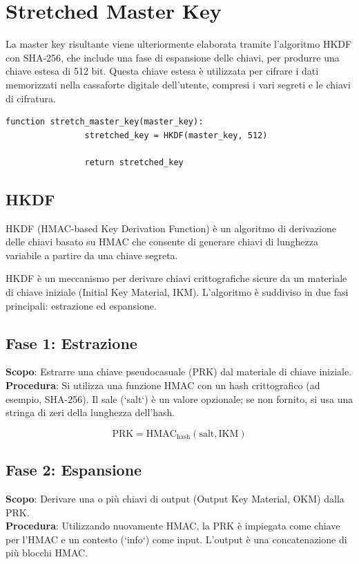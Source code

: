 \documentclass[a4paper,12pt]{report}
\begin{document}
		\section{Stretched Master Key}
		La master key risultante viene
		ulteriormente elaborata tramite l'algoritmo HKDF con SHA-256, che include una
		fase di espansione delle chiavi, per produrre una chiave estesa di 512 bit.
		Questa chiave estesa è utilizzata per cifrare i dati memorizzati nella
		cassaforte digitale dell'utente, compresi i vari segreti e le chiavi di
		cifratura.
		\begin{lstlisting}[style=pseudocode]
			function stretch_master_key(master_key):
				stretched_key = HKDF(master_key, 512)

				return stretched_key
		\end{lstlisting}
		\subsection{HKDF}
			HKDF (HMAC-based Key Derivation Function) è un algoritmo di derivazione delle
			chiavi basato su HMAC che consente di generare chiavi di lunghezza variabile a
			partire da una chiave segreta. 
			
			HKDF è un meccanismo per derivare chiavi crittografiche sicure da un
			materiale di chiave iniziale (Initial Key Material, IKM). L'algoritmo è
			suddiviso in due fasi principali: estrazione ed espansione.

		\subsection*{Fase 1: Estrazione}

		\textbf{Scopo}: Estrarre una chiave pseudocasuale (PRK) dal materiale di
		chiave iniziale.\\
		\textbf{Procedura}: Si utilizza una funzione HMAC con un hash
		crittografico (ad esempio, SHA-256). Il sale (`salt`) è un valore
		opzionale; se non fornito, si usa una stringa di zeri della lunghezza
		dell'hash.

		\[
		\text{PRK} = \text{HMAC}_\text{hash}(\text{salt}, \text{IKM})
		\]

		\subsection*{Fase 2: Espansione}

		\textbf{Scopo}: Derivare una o più chiavi di output (Output Key
		Material, OKM) dalla PRK.\\
		\textbf{Procedura}: Utilizzando nuovamente HMAC, la PRK è impiegata come
		chiave per l'HMAC e un contesto (`info`) come input. L'output è una
		concatenazione di più blocchi HMAC.
\end{document}
